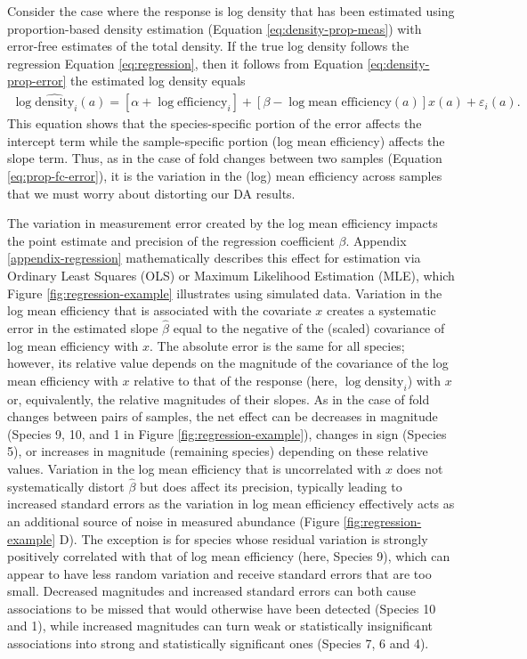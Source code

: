 \documentclass[
]{article}
\begin{document}
Consider the case where the response is log density that has been estimated using proportion-based density estimation (Equation \eqref{eq:density-prop-meas}) with error-free estimates of the total density.
If the true log density follows the regression Equation \eqref{eq:regression}, then it follows from Equation \eqref{eq:density-prop-error} the estimated log density equals
\begin{align}
  \label{eq:regression-error}
  \log \widehat{\text{density}}_i(a)
  = [\alpha + \log \text{efficiency}_i] + [\beta - \log \text{mean efficiency}(a)] x(a) + \varepsilon_i(a).
\end{align}
This equation shows that the species-specific portion of the error affects the intercept term while the sample-specific portion (log mean efficiency) affects the slope term.
Thus, as in the case of fold changes between two samples (Equation \eqref{eq:prop-fc-error}), it is the variation in the (log) mean efficiency across samples that we must worry about distorting our DA results.

The variation in measurement error created by the log mean efficiency impacts the point estimate and precision of the regression coefficient \(\beta\).
Appendix \ref{appendix-regression} mathematically describes this effect for estimation via Ordinary Least Squares (OLS) or Maximum Likelihood Estimation (MLE), which Figure \ref{fig:regression-example} illustrates using simulated data.
Variation in the log mean efficiency that is associated with the covariate \(x\) creates a systematic error in the estimated slope \(\hat \beta\) equal to the negative of the (scaled) covariance of log mean efficiency with \(x\).
The absolute error is the same for all species; however, its relative value depends on the magnitude of the covariance of the log mean efficiency with \(x\) relative to that of the response (here, \(\log \text{density}_{i}\)) with \(x\) or, equivalently, the relative magnitudes of their slopes.
As in the case of fold changes between pairs of samples, the net effect can be decreases in magnitude (Species 9, 10, and 1 in Figure \ref{fig:regression-example}), changes in sign (Species 5), or increases in magnitude (remaining species) depending on these relative values.
Variation in the log mean efficiency that is uncorrelated with \(x\) does not systematically distort \(\hat \beta\) but does affect its precision, typically leading to increased standard errors as the variation in log mean efficiency effectively acts as an additional source of noise in measured abundance (Figure \ref{fig:regression-example} D).
The exception is for species whose residual variation is strongly positively correlated with that of log mean efficiency (here, Species 9), which can appear to have less random variation and receive standard errors that are too small.
Decreased magnitudes and increased standard errors can both cause associations to be missed that would otherwise have been detected (Species 10 and 1), while increased magnitudes can turn weak or statistically insignificant associations into strong and statistically significant ones (Species 7, 6 and 4).
\end{document}
